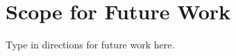 \def\baselinestretch{1}
\chapter{Scope for Future Work}
\graphicspath{{Futurework/Futurework/EPS/}{Futurework/FutureworkFigs/}}
\def\baselinestretch{1.66}

Type in directions for future work here. 

